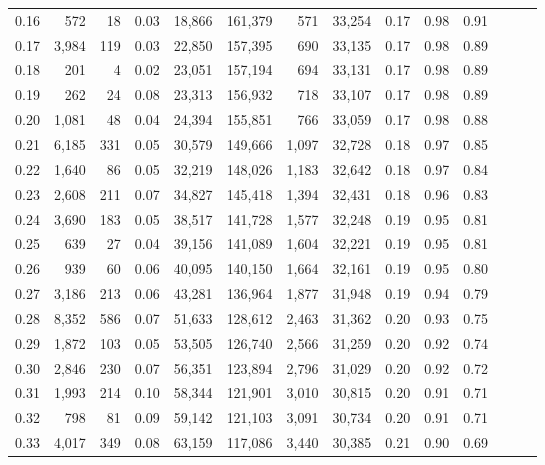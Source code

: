 \begin{tabular}{rrrrrrrrrrrrrr}
0.16 &     572 &     18 &  0.03 &   18,866 &  161,379 &     571 &  33,254 &  0.17 &  0.98 &      0.91 \\
0.17 &   3,984 &    119 &  0.03 &   22,850 &  157,395 &     690 &  33,135 &  0.17 &  0.98 &      0.89 \\
0.18 &     201 &      4 &  0.02 &   23,051 &  157,194 &     694 &  33,131 &  0.17 &  0.98 &      0.89 \\
0.19 &     262 &     24 &  0.08 &   23,313 &  156,932 &     718 &  33,107 &  0.17 &  0.98 &      0.89 \\
0.20 &   1,081 &     48 &  0.04 &   24,394 &  155,851 &     766 &  33,059 &  0.17 &  0.98 &      0.88 \\
0.21 &   6,185 &    331 &  0.05 &   30,579 &  149,666 &   1,097 &  32,728 &  0.18 &  0.97 &      0.85 \\
0.22 &   1,640 &     86 &  0.05 &   32,219 &  148,026 &   1,183 &  32,642 &  0.18 &  0.97 &      0.84 \\
0.23 &   2,608 &    211 &  0.07 &   34,827 &  145,418 &   1,394 &  32,431 &  0.18 &  0.96 &      0.83 \\
0.24 &   3,690 &    183 &  0.05 &   38,517 &  141,728 &   1,577 &  32,248 &  0.19 &  0.95 &      0.81 \\
0.25 &     639 &     27 &  0.04 &   39,156 &  141,089 &   1,604 &  32,221 &  0.19 &  0.95 &      0.81 \\
0.26 &     939 &     60 &  0.06 &   40,095 &  140,150 &   1,664 &  32,161 &  0.19 &  0.95 &      0.80 \\
0.27 &   3,186 &    213 &  0.06 &   43,281 &  136,964 &   1,877 &  31,948 &  0.19 &  0.94 &      0.79 \\
0.28 &   8,352 &    586 &  0.07 &   51,633 &  128,612 &   2,463 &  31,362 &  0.20 &  0.93 &      0.75 \\
0.29 &   1,872 &    103 &  0.05 &   53,505 &  126,740 &   2,566 &  31,259 &  0.20 &  0.92 &      0.74 \\
0.30 &   2,846 &    230 &  0.07 &   56,351 &  123,894 &   2,796 &  31,029 &  0.20 &  0.92 &      0.72 \\
0.31 &   1,993 &    214 &  0.10 &   58,344 &  121,901 &   3,010 &  30,815 &  0.20 &  0.91 &      0.71 \\
0.32 &     798 &     81 &  0.09 &   59,142 &  121,103 &   3,091 &  30,734 &  0.20 &  0.91 &      0.71 \\
0.33 &   4,017 &    349 &  0.08 &   63,159 &  117,086 &   3,440 &  30,385 &  0.21 &  0.90 &      0.69 \\

\end{tabular}
